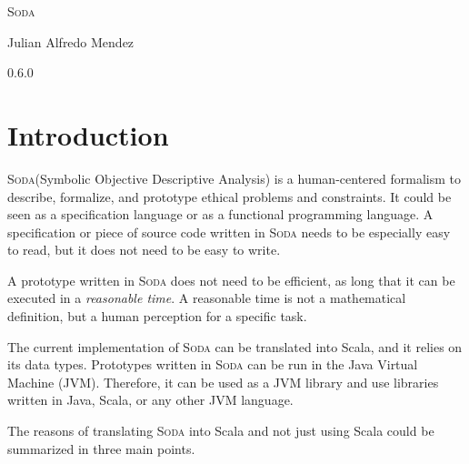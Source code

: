 \documentclass[12pt,a4paper]{book}
\newcommand{\Soda}{\textsc{Soda}\xspace}
\begin{document}

    \begin{center}

        \phantom{H}

        \vspace{80mm}

        {\huge{\Soda}}

        \vspace{80mm}
        Julian Alfredo Mendez

        \vspace{10mm}
        0.6.0

    \end{center}

    \newpage


    \chapter{Introduction}

    \Soda (Symbolic Objective Descriptive Analysis) is a human-centered formalism to describe, formalize, and prototype ethical problems and constraints.
    It could be seen as a specification language or as a functional programming language.
    A specification or piece of source code written in \Soda needs to be especially easy to read, but it does not need to be easy to write.

    A prototype written in \Soda does not need to be efficient, as long that it can be executed in a \textit{reasonable time}.
    A reasonable time is not a mathematical definition, but a human perception for a specific task.

    The current implementation of \Soda can be translated into Scala, and it relies on its data types.
    Prototypes written in \Soda can be run in the Java Virtual Machine (JVM).
    Therefore, it can be used as a JVM library and use libraries written in Java, Scala, or any other JVM language.

    The reasons of translating \Soda into Scala and not just using Scala could be summarized in three main points.
\end{document}
